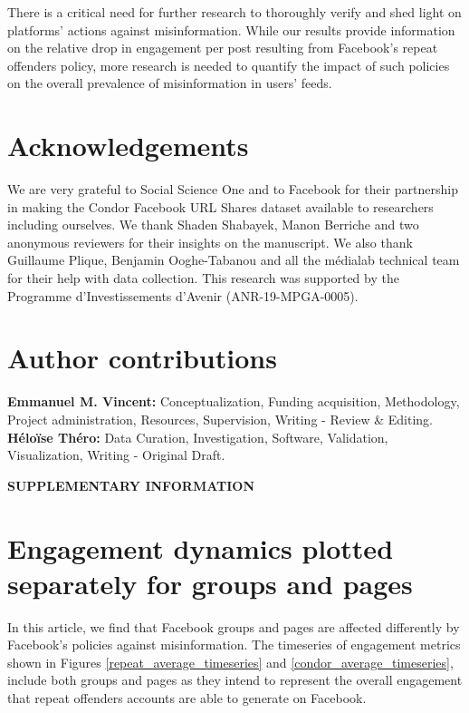 \documentclass[review]{elsarticle}
\newcommand{\beginsupplement}{%
        \setcounter{table}{0}
        \renewcommand{\thetable}{S\arabic{table}}%
        \setcounter{figure}{0}
        \renewcommand{\thefigure}{S\arabic{figure}}%
     }
\begin{document}
{{There is a critical need for further research to thoroughly verify and shed light on platforms' actions against misinformation. 
While our results provide information on the relative drop in engagement per post resulting from Facebook’s repeat offenders policy, more research is needed to quantify the impact of such policies on the overall prevalence of misinformation in users’ feeds.

\section*{Acknowledgements}

We are very grateful to Social Science One and to Facebook for their partnership in making the Condor Facebook URL Shares dataset available to researchers including ourselves.
We thank Shaden Shabayek, Manon Berriche and two anonymous reviewers for their insights on the manuscript.
We also thank Guillaume Plique, Benjamin Ooghe-Tabanou and all the médialab technical team for their help with data collection.
This research was supported by the Programme d’Investissements d’Avenir (ANR-19-MPGA-0005).

\section*{Author contributions}

\textbf{Emmanuel M. Vincent:} Conceptualization, Funding acquisition, Methodology, Project administration, Resources, Supervision, Writing - Review \& Editing.
\textbf{Héloïse Théro:} Data Curation, Investigation, Software, Validation, Visualization, Writing - Original Draft.



\newpage

\beginsupplement

\textbf{SUPPLEMENTARY INFORMATION}

\section*{Engagement dynamics plotted separately for groups and pages}

In this article, we find that Facebook groups and pages are affected differently by Facebook’s policies against misinformation.
The timeseries of engagement metrics shown in Figures \ref{repeat_average_timeseries} and \ref{condor_average_timeseries}, include both groups and pages as they intend to represent the overall engagement that repeat offenders accounts are able to generate on Facebook.

}}
\end{document}
